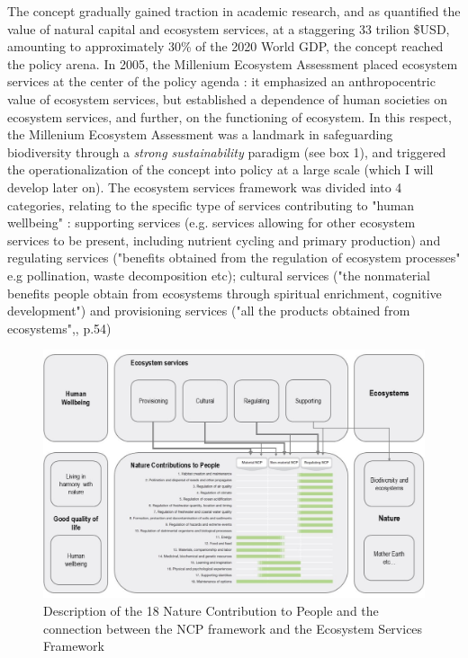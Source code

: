 The concept gradually gained traction in academic research, and as \cite{Costanza1997} quantified the value of natural capital and ecosystem services, at a staggering 33 trilion \$USD, amounting to approximately 30\% of the 2020 World GDP, the concept reached the policy arena. In 2005, the Millenium Ecosystem Assessment \citep{MEA2005} placed ecosystem services at the center of the policy agenda : it emphasized an anthropocentric value of ecosystem services, but established a dependence of human societies on ecosystem services, and further, on the functioning of ecosystem. In this respect, the Millenium Ecosystem Assessment \cite{MEA2005} was a landmark in safeguarding biodiversity through a \textit{strong sustainability} paradigm (see box 1), and triggered the operationalization of the concept into policy at a large scale (which I will develop later on). The ecosystem services framework was divided into 4 categories, relating to the specific type of services contributing to "human wellbeing" : supporting services (e.g. services allowing for other ecosystem services to be present, including nutrient cycling and primary production) and regulating services ("benefits obtained from the regulation of ecosystem processes" e.g pollination, waste decomposition etc); cultural services ("the nonmaterial benefits people obtain from ecosystems through spiritual enrichment, cognitive development") and provisioning services ("all the products obtained from ecosystems",\cite{MEA2005}, p.54)

\begin{figure}[h]
	\centering
	\includegraphics[width = \textwidth]{figures/intro/NCPs2.jpg}
	\caption{Description of the 18 Nature Contribution to People and the connection between the NCP framework \citep{ipbes_2022_6417333} and the Ecosystem Services Framework \citep{millennium2005ecosystems}}
\end{figure}

